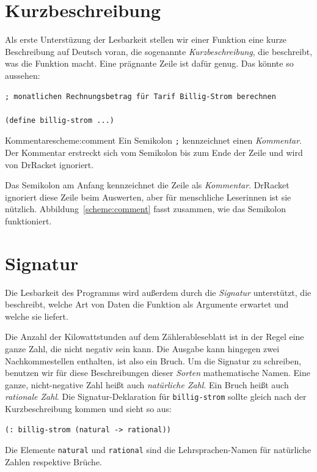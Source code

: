 \section{Kurzbeschreibung}

Als erste Unterstüzung der Lesbarkeit stellen wir einer Funktion eine
kurze Beschreibung auf Deutsch voran, die
sogenannte \textit{Kurzbeschreibung}, die
beschreibt, was die Funktion macht.  Eine prägnante Zeile ist dafür
genug.  Das könnte so aussehen:
%
\begin{verbatim}
; monatlichen Rechnungsbetrag für Tarif Billig-Strom berechnen

(define billig-strom ...)
\end{verbatim}
%
\begin{feature}{Kommentare}{scheme:comment}
  Ein Semikolon \texttt{;} kennzeichnet einen 
  \textit{Kommentar}.  Der Kommentar erstreckt sich
  vom Semikolon bis zum Ende der Zeile und wird von DrRacket
  ignoriert.
\end{feature}
%
Das Semikolon am Anfang kennzeichnet die Zeile als
\textit{Kommentar}. DrRacket ignoriert diese Zeile
beim Auswerten, aber für menschliche Leserinnen ist sie nützlich.
Abbildung~\ref{scheme:comment} fasst zusammen, wie das Semikolon
funktioniert.

\section{Signatur}

Die Lesbarkeit des Programms wird außerdem durch die
\textit{Signatur} unterstützt, die
beschreibt, welche Art von Daten die Funktion als Argumente erwartet und welche sie liefert.

Die Anzahl der Kilowattstunden auf dem Zählerableseblatt ist in der
Regel eine ganze Zahl, die nicht negativ sein kann.  Die Ausgabe kann
hingegen zwei Nachkommestellen enthalten, ist also ein Bruch.  Um die
Signatur zu schreiben, benutzen wir für diese Beschreibungen dieser
\textit{Sorten} mathematische Namen.  Eine ganze,
nicht-negative Zahl heißt auch \textit{natürliche
  Zahl}.  Ein Bruch heißt auch
\textit{rationale Zahl}.  Die
Signatur-Deklaration für \texttt{billig-strom} sollte gleich nach der
Kurzbeschreibung kommen und sieht so aus:
%
\begin{verbatim}
(: billig-strom (natural -> rational))
\end{verbatim}
%
Die Elemente \texttt{natural} und \texttt{rational} sind die
Lehrsprachen-Namen für natürliche Zahlen respektive Brüche.

